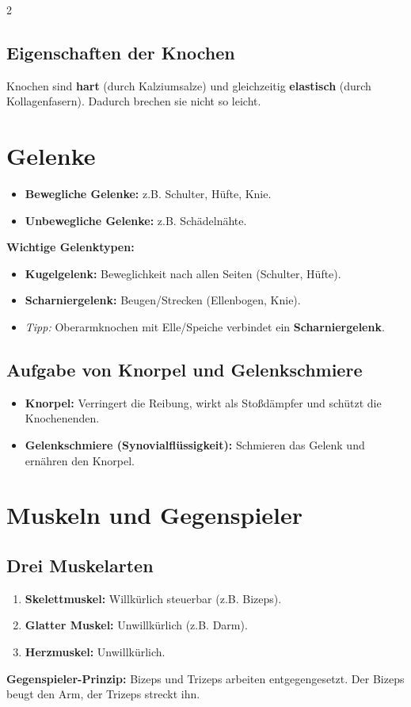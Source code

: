 \documentclass[12pt,a4paper]{article}
\begin{document}
\begin{multicols}{2}
		\subsection*{Eigenschaften der Knochen}
		Knochen sind \textbf{hart} (durch Kalziumsalze) und gleichzeitig \textbf{elastisch} (durch Kollagenfasern). Dadurch brechen sie nicht so leicht.
		
		\section*{Gelenke}
		\begin{itemize}[noitemsep]
			\item \textbf{Bewegliche Gelenke:} z.B. Schulter, Hüfte, Knie.
			\item \textbf{Unbewegliche Gelenke:} z.B. Schädelnähte.
		\end{itemize}
		\noindent \textbf{Wichtige Gelenktypen:}
		\begin{itemize}[noitemsep]
			\item \textbf{Kugelgelenk:} Beweglichkeit nach allen Seiten (Schulter, Hüfte).
			\item \textbf{Scharniergelenk:} Beugen/Strecken (Ellenbogen, Knie). 
			\item \textit{Tipp:} Oberarmknochen mit Elle/Speiche verbindet ein \textbf{Scharniergelenk}.
		\end{itemize}
		
		\subsection*{Aufgabe von Knorpel und Gelenkschmiere}
		\begin{itemize}[noitemsep]
			\item \textbf{Knorpel:} Verringert die Reibung, wirkt als Stoßdämpfer und schützt die Knochenenden.
			\item \textbf{Gelenkschmiere (Synovialflüssigkeit):} Schmieren das Gelenk und ernähren den Knorpel.
		\end{itemize}
		
		\section*{Muskeln und Gegenspieler}
		\subsection*{Drei Muskelarten}
		\begin{enumerate}[noitemsep]
			\item \textbf{Skelettmuskel:} Willkürlich steuerbar (z.B. Bizeps).
			\item \textbf{Glatter Muskel:} Unwillkürlich (z.B. Darm).
			\item \textbf{Herzmuskel:} Unwillkürlich.
		\end{enumerate}
		\noindent \textbf{Gegenspieler-Prinzip:} Bizeps und Trizeps arbeiten entgegengesetzt. Der Bizeps beugt den Arm, der Trizeps streckt ihn.
		

\end{multicols}
\end{document}
